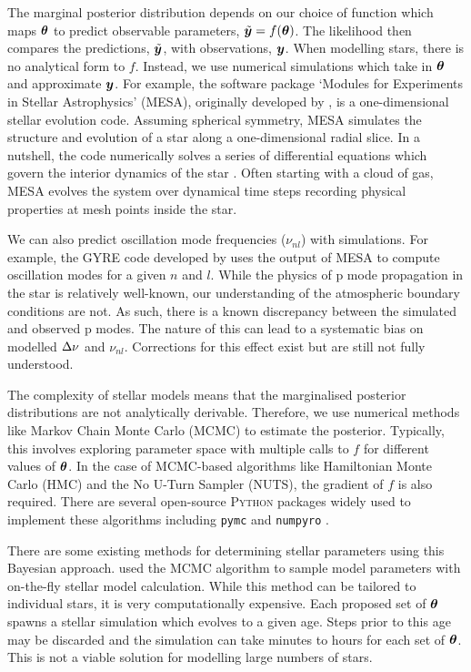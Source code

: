 The marginal posterior distribution depends on our choice of function which maps \(\bm{\theta}\) to predict observable parameters, \(\tilde{\bm{y}} = f(\bm{\theta})\). The likelihood then compares the predictions, \(\tilde{\bm{y}}\), with observations, \(\bm{y}\). When modelling stars, there is no analytical form to \(f\). Instead, we use numerical simulations which take in \(\bm{\theta}\) and approximate \(\bm{y}\). For example, the software package `Modules for Experiments in Stellar Astrophysics' (MESA), originally developed by \citet{Paxton.Bildsten.ea2011}, is a one-dimensional stellar evolution code. Assuming spherical symmetry, MESA simulates the structure and evolution of a star along a one-dimensional radial slice. In a nutshell, the code numerically solves a series of differential equations which govern the interior dynamics of the star \citep[see e.g.][]{Kippenhahn.Weigert.ea2013}. Often starting with a cloud of gas, MESA evolves the system over dynamical time steps recording physical properties at mesh points inside the star.

We can also predict oscillation mode frequencies (\(\nu_{nl}\)) with simulations. For example, the GYRE code developed by \citet{Townsend.Teitler2013} uses the output of MESA to compute oscillation modes for a given \(n\) and \(l\). While the physics of p mode propagation in the star is relatively well-known, our understanding of the atmospheric boundary conditions are not. As such, there is a known discrepancy between the simulated and observed p modes. The nature of this can lead to a systematic bias on modelled \({\Delta\nu}\) and \(\nu_{nl}\). Corrections for this effect exist \citep[e.g.][]{Ball.Gizon2014} but are still not fully understood.

The complexity of stellar models means that the marginalised posterior distributions are not analytically derivable. Therefore, we use numerical methods like Markov Chain Monte Carlo (MCMC) to estimate the posterior. Typically, this involves exploring parameter space with multiple calls to \(f\) for different values of \(\bm{\theta}\). In the case of MCMC-based algorithms like Hamiltonian Monte Carlo (HMC) and the No U-Turn Sampler (NUTS), the gradient of \(f\) is also required. There are several open-source \textsc{Python} packages widely used to implement these algorithms including \texttt{pymc} \citep{Salvatier.Wiecki.ea2016} and \texttt{numpyro} \citep{Phan.Pradhan.ea2019}.

There are some existing methods for determining stellar parameters using this Bayesian approach. \citet{Bazot.Bourguignon.ea2008} used the MCMC algorithm to sample model parameters with on-the-fly stellar model calculation. While this method can be tailored to individual stars, it is very computationally expensive. Each proposed set of \(\bm{\theta}\) spawns a stellar simulation which evolves to a given age. Steps prior to this age may be discarded and the simulation can take minutes to hours for each set of \(\bm{\theta}\). This is not a viable solution for modelling large numbers of stars.

